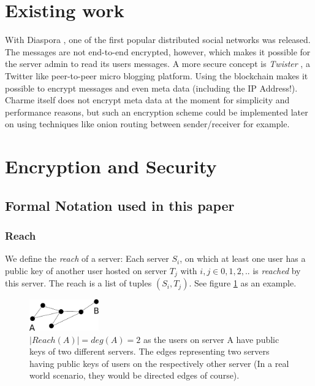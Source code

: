 \documentclass{scrartcl}
\begin{document}
 \section{Existing work}
With Diaspora \cite{diaspora}, one of the first popular distributed social networks was released. The messages are not end-to-end encrypted, however, which makes it possible for the server admin to read its users messages. 
A more secure concept is \textit{Twister} \cite{twister}, a Twitter like peer-to-peer micro blogging platform. Using the blockchain makes it possible to encrypt messages and even meta data (including the IP Address!). Charme itself does not encrypt meta data at the moment for simplicity and performance reasons, but such an encryption scheme could be implemented later on using techniques like onion routing between sender/receiver for example.

\newpage
 \section{Encryption and Security}

\subsection{Formal Notation used in this paper}
\subsubsection{Reach}
 We define the \textit{reach} of a server: Each server $S_i$, on which at least one user has a public key of another user hosted on server $T_j$ with $i,j \in {0,1,2,..}$ is \textit{reached} by this server.
The reach is a list of tuples $(S_i, T_j)$. See figure \ref{figContextGraph} as an example.

\begin{figure}[ht]
	\centering
    \includegraphics[width=30mm]{illustrations/graph.pdf}

	\caption{$|Reach(A)| = deg(A) = 2
$ as the users on server A have public keys of two different servers. The edges representing two servers having public keys of users on the respectively other server (In a real world scenario, they would be directed edges of course). }
	\label{figContextGraph}
\end{figure}
\end{document}
